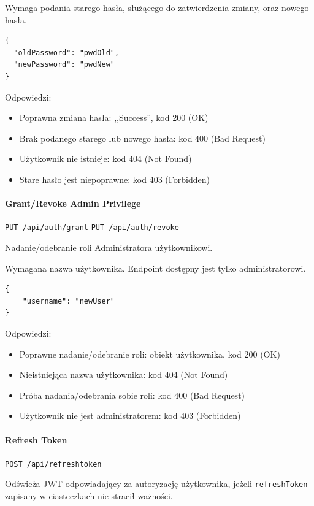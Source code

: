 \documentclass[a4paper,twoside,12pt]{book}
\begin{document}
Wymaga podania starego hasła, służącego do zatwierdzenia zmiany, oraz nowego hasła.

\begin{verbatim}
{
  "oldPassword": "pwdOld",
  "newPassword": "pwdNew"
}
\end{verbatim}

Odpowiedzi: 
\begin{itemize}
	\item Poprawna zmiana hasła: ,,Success'', kod 200 (OK)
	\item Brak podanego starego lub nowego hasła: kod 400 (Bad Request) 
	\item Użytkownik nie istnieje: kod 404 (Not Found) 
	\item Stare hasło jest niepoprawne: kod 403 (Forbidden)
\end{itemize}


\paragraph{Grant/Revoke Admin Privilege}

\texttt{PUT /api/auth/grant} \texttt{PUT /api/auth/revoke}

Nadanie/odebranie roli Administratora użytkownikowi.

Wymagana nazwa użytkownika. Endpoint dostępny jest tylko administratorowi.

\begin{verbatim}
{
    "username": "newUser"
}
\end{verbatim}

Odpowiedzi: 
\begin{itemize}
	\item Poprawne nadanie/odebranie roli: obiekt użytkownika, kod 200 (OK) 
	\item Nieistniejąca nazwa użytkownika: kod 404 (Not Found) 
	\item Próba nadania/odebrania sobie roli: kod 400 (Bad Request) 
	\item Użytkownik nie jest administratorem: kod 403 (Forbidden)
\end{itemize}


\paragraph{Refresh Token}

\texttt{POST /api/refreshtoken}

Odświeża JWT odpowiadający za autoryzację użytkownika, jeżeli \texttt{refreshToken} zapisany w ciasteczkach nie stracił ważności.
\end{document}
